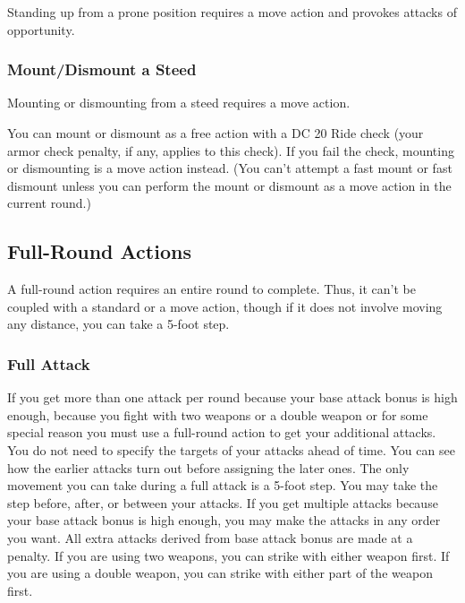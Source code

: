 Standing up from a prone position requires a move action and provokes attacks of opportunity.

\subsubsection{Mount/Dismount a Steed}

Mounting or dismounting from a steed requires a move action.

You can mount or dismount as a free action with a DC 20 Ride check (your armor check penalty, if any, applies to this check). If you fail the check, mounting or dismounting is a move action instead. (You can't attempt a fast mount or fast dismount unless you can perform the mount or dismount as a move action in the current round.)

\subsection{Full-Round Actions}

A full-round action requires an entire round to complete. Thus, it can't be coupled with a standard or a move action, though if it does not involve moving any distance, you can take a 5-foot step.

\subsubsection{Full Attack}

If you get more than one attack per round because your base attack bonus is high enough, because you fight with two weapons or a double weapon or for some special reason you must use a full-round action to get your additional attacks. You do not need to specify the targets of your attacks ahead of time. You can see how the earlier attacks turn out before assigning the later ones. The only movement you can take during a full attack is a 5-foot step. You may take the step before, after, or between your attacks. If you get multiple attacks because your base attack bonus is high enough, you may make the attacks in any order you want. All extra attacks derived from base attack bonus are made at a  penalty. If you are using two weapons, you can strike with either weapon first. If you are using a double weapon, you can strike with either part of the weapon first.

\vspace*{10pt}

